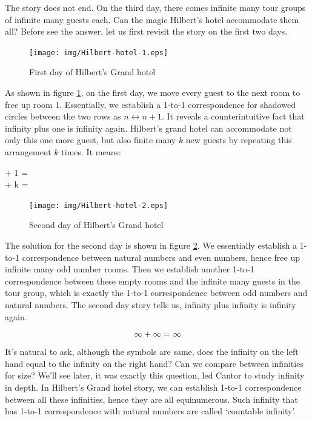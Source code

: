 \documentclass{article}
\begin{document}
The story does not end. On the third day, there comes infinite many tour groups of infinite many guests each. Can the magic Hilbert's hotel accommodate them all? Before see the answer, let us first revisit the story on the first two days.

\begin{figure}[htbp]
 \centering
 \texttt{[image: img/Hilbert-hotel-1.eps]}
 \caption{First day of Hilbert's Grand hotel}
 \label{fig:Hilbert-hotel-1}
\end{figure}

As shown in figure \ref{fig:Hilbert-hotel-1}, on the first day, we move every guest to the next room to free up room 1. Essentially, we establish a 1-to-1 correspondence for shadowed circles between the two rows as $n \leftrightarrow n+1$. It reveals a counterintuitive fact that infinity plus one is infinity again. Hilbert's grand hotel can accommodate not only this one more guest, but also finite many $k$ new guests by repeating this arrangement $k$ times. It means:

\bean
\infty + 1 = \infty \\
\infty + k = \infty \\
\eean

\begin{figure}[htbp]
 \centering
 \texttt{[image: img/Hilbert-hotel-2.eps]}
 \caption{Second day of Hilbert's Grand hotel}
 \label{fig:Hilbert-hotel-2}
\end{figure}

The solution for the second day is shown in figure \ref{fig:Hilbert-hotel-2}. We essentially establish a 1-to-1 correspondence between natural numbers and even numbers, hence free up infinite many odd number rooms. Then we establish another 1-to-1 correspondence between these empty rooms and the infinite many guests in the tour group, which is exactly the 1-to-1 correspondence between odd numbers and natural numbers. The second day story tells us, infinity plus infinity is infinity again.

\[
\infty + \infty = \infty
\]

It's natural to ask, although the symbols are same, does the infinity on the left hand equal to the infinity on the right hand? Can we compare between infinities for size? We'll see later, it was exactly this question, led Cantor to study infinity in depth. In Hilbert's Grand hotel story, we can establish 1-to-1 correspondence between all these infinities, hence they are all equinumerous. Such infinity that has 1-to-1 correspondence with natural numbers are called `countable infinity'.
\end{document}
